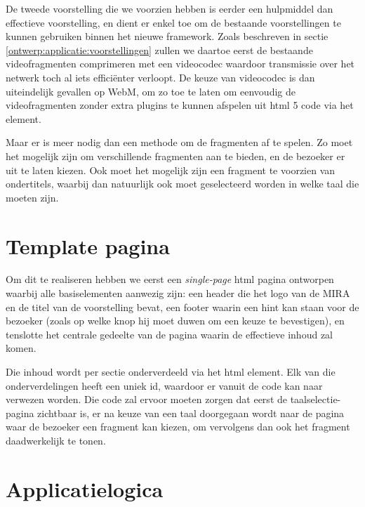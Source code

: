 De tweede voorstelling die we voorzien hebben is eerder een hulpmiddel dan effectieve voorstelling, en dient er enkel toe om de bestaande voorstellingen te kunnen gebruiken binnen het nieuwe framework. Zoals beschreven in sectie \ref{ontwerp:applicatie:voorstellingen} zullen we daartoe eerst de bestaande videofragmenten comprimeren met een videocodec waardoor transmissie over het netwerk toch al iets efficiënter verloopt. De keuze van videocodec is dan uiteindelijk gevallen op WebM, om zo toe te laten om eenvoudig de videofragmenten zonder extra plugins te kunnen afspelen uit \ac{html} 5 code via het  element.

Maar er is meer nodig dan een methode om de fragmenten af te spelen. Zo moet het mogelijk zijn om verschillende fragmenten aan te bieden, en de bezoeker er uit te laten kiezen. Ook moet het mogelijk zijn een fragment te voorzien van ondertitels, waarbij dan natuurlijk ook moet geselecteerd worden in welke taal die moeten zijn.

\section{Template pagina}
\label{voorstellingen:metavoorstelling:template}

Om dit te realiseren hebben we eerst een \emph{single-page} \ac{html} pagina ontworpen waarbij alle basiselementen aanwezig zijn: een header die het logo van de MIRA en de titel van de voorstelling bevat, een footer waarin een hint kan staan voor de bezoeker (zoals op welke knop hij moet duwen om een keuze te bevestigen), en tenslotte het centrale gedeelte van de pagina waarin de effectieve inhoud zal komen.

Die inhoud wordt per sectie onderverdeeld via het \ac{html}  element. Elk van die onderverdelingen heeft een uniek id, waardoor er vanuit de code kan naar verwezen worden. Die code zal ervoor moeten zorgen dat eerst de taalselectie-pagina zichtbaar is, er na keuze van een taal doorgegaan wordt naar de pagina waar de bezoeker een fragment kan kiezen, om vervolgens dan ook het fragment daadwerkelijk te tonen.

\section{Applicatielogica}
\label{voorstellingen:metavoorstelling:logica}


